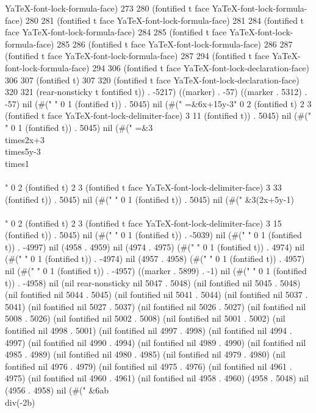 YaTeX-font-lock-formula-face) 273 280 (fontified t face YaTeX-font-lock-formula-face) 280 281 (fontified t face YaTeX-font-lock-formula-face) 281 284 (fontified t face YaTeX-font-lock-formula-face) 284 285 (fontified t face YaTeX-font-lock-formula-face) 285 286 (fontified t face YaTeX-font-lock-formula-face) 286 287 (fontified t face YaTeX-font-lock-formula-face) 287 294 (fontified t face YaTeX-font-lock-formula-face) 294 306 (fontified t face YaTeX-font-lock-declaration-face) 306 307 (fontified t) 307 320 (fontified t face YaTeX-font-lock-declaration-face) 320 321 (rear-nonsticky t fontified t)) . -5217) ((marker) . -57) ((marker . 5312) . -57) nil (#("
" 0 1 (fontified t)) . 5045) nil (#("	=&6x+15y-3" 0 2 (fontified t) 2 3 (fontified t face YaTeX-font-lock-delimiter-face) 3 11 (fontified t)) . 5045) nil (#("
" 0 1 (fontified t)) . 5045) nil (#("	=&3\\times2x+3\\times5y-3\\times1\\\\" 0 2 (fontified t) 2 3 (fontified t face YaTeX-font-lock-delimiter-face) 3 33 (fontified t)) . 5045) nil (#("
" 0 1 (fontified t)) . 5045) nil (#("	 &3(2x+5y-1)\\\\" 0 2 (fontified t) 2 3 (fontified t face YaTeX-font-lock-delimiter-face) 3 15 (fontified t)) . 5045) nil (#(" " 0 1 (fontified t)) . -5039) nil (#(" " 0 1 (fontified t)) . -4997) nil (4958 . 4959) nil (4974 . 4975) (#(" " 0 1 (fontified t)) . 4974) nil (#("	" 0 1 (fontified t)) . -4974) nil (4957 . 4958) (#(" " 0 1 (fontified t)) . 4957) nil (#("	" 0 1 (fontified t)) . -4957) ((marker . 5899) . -1) nil (#(" " 0 1 (fontified t)) . -4958) nil (nil rear-nonsticky nil 5047 . 5048) (nil fontified nil 5045 . 5048) (nil fontified nil 5044 . 5045) (nil fontified nil 5041 . 5044) (nil fontified nil 5037 . 5041) (nil fontified nil 5027 . 5037) (nil fontified nil 5026 . 5027) (nil fontified nil 5008 . 5026) (nil fontified nil 5002 . 5008) (nil fontified nil 5001 . 5002) (nil fontified nil 4998 . 5001) (nil fontified nil 4997 . 4998) (nil fontified nil 4994 . 4997) (nil fontified nil 4990 . 4994) (nil fontified nil 4989 . 4990) (nil fontified nil 4985 . 4989) (nil fontified nil 4980 . 4985) (nil fontified nil 4979 . 4980) (nil fontified nil 4976 . 4979) (nil fontified nil 4975 . 4976) (nil fontified nil 4961 . 4975) (nil fontified nil 4960 . 4961) (nil fontified nil 4958 . 4960) (4958 . 5048) nil (4956 . 4958) nil (#("  &6ab\\div(-2b)\\\\
